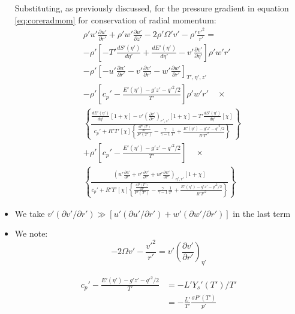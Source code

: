\documentclass[preprint, prX]{revtex4}
\newcommand{\dd}[2]{\frac{d#1}{d#2}}
\newcommand{\pd}[2]{\frac{\partial#1}{\partial#2}}
\newcommand{\tpd}[3]{\left( \frac{\partial#1}{\partial#2} \right)_{#3}}
\newcommand{\vppd}[2]{(\partial#1 / \partial#2)}
\newcommand{\gogmo}{\frac{\gamma}{\gamma-1}}
\begin{document}
\begin{itemize}
Substituting, as previously discussed, for the pressure gradient in equation \eqref{eq:coreradmom} for conservation of radial momentum:
\begin{equation}
\begin{split}
&\rho'u'\pd{u'}{r'} + \rho' w' \pd{u'}{z'} - 2 \rho' \Omega'v' - \rho'\frac{v'^2}{r'} = \\
&-\rho'\left[ -T' \dd{S'(\eta')}{\eta'} +\dd{E'(\eta')}{\eta'}- v' \pd{v'}{\eta'} \right] \rho' w' r' \\
& - \rho' \left[ -u'\pd{u'}{r'} -v'\pd{v'}{r'} -w'\pd{w'}{r'}\right]_{T',\eta',z'} \\
& - \rho' \left[ c_p' - \frac{E'(\eta') - g'z' - q'^2/2}{T'}\right]\rho' w' r' \quad \times \\
&\left\{ \frac{\dd{E'(\eta')}{\eta'}\left[ 1+\chi\right] - v'\tpd{v'}{r'}{r',z'}\left[ 1 + \chi \right] - T' \dd{S'(\eta')}{\eta'}[\chi]}{c_p'+R'T'[\chi] \left\{ \frac{\dd{P'(T')}{T'}}{P'(T')} -\gogmo \frac{1}{T'} + \frac{E'(\eta') - g'z' - q'^2/2}{R'T'^2} \right\} }\right\} \\
&+ \rho' \left[ c_p' - \frac{E'(\eta') - g'z'-q'^2/2}{T'}\right] \quad \times \\
& \left\{ \frac{ \left( u'\pd{u'}{r'} +v'\pd{v'}{r'} + w'\pd{w'}{r'} \right)_{\eta',r'} [1+\chi] }{c_p' + R'T'[\chi] \left\{ \frac{\dd{P'(T')}{T'}}{P'(T')} -\gogmo \frac{1}{T'} + \frac{E'(\eta') - g'z' - q'^2/2}{R'T'^2}\right \} }	\right\}
\end{split}
\end{equation}

\item
We take $v'\vppd{v'}{r'} \gg \left[ u' \vppd{u'}{r'} + w'\vppd{w'}{r'}\right]$ in the last term

\item
We note:
\begin{equation}
-2 \Omega v' - \frac{v'^2}{r'} = v'\tpd{v'}{r'}{\eta'}
\end{equation}

\begin{equation}
\begin{split}
c_p' - \frac{E'(\eta') - g' z' - q'^2/2}{T'} &= -L' Y_s'(T')/T' \\
&= -\frac{L'}{T'}\frac{\sigma P'(T')}{p'}
\end{split}
\end{equation}


\end{itemize}
\end{document}
